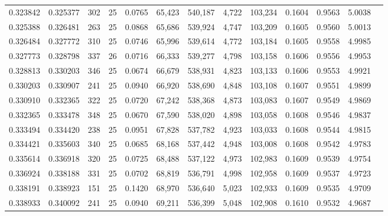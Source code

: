 \begin{tabular}{rrrrrrrrrrrrr}
0.323842 & 0.325377 &   302 &  25 &                                     0.0765 &  65,423 & 540,187 &   4,722 & 103,234 & 0.1604 & 0.9563 & 5.0038 \\
0.325388 & 0.326481 &   263 &  25 &                                     0.0868 &  65,686 & 539,924 &   4,747 & 103,209 & 0.1605 & 0.9560 & 5.0013 \\
0.326484 & 0.327772 &   310 &  25 &                                     0.0746 &  65,996 & 539,614 &   4,772 & 103,184 & 0.1605 & 0.9558 & 4.9985 \\
0.327773 & 0.328798 &   337 &  26 &                                     0.0716 &  66,333 & 539,277 &   4,798 & 103,158 & 0.1606 & 0.9556 & 4.9953 \\
0.328813 & 0.330203 &   346 &  25 &                                     0.0674 &  66,679 & 538,931 &   4,823 & 103,133 & 0.1606 & 0.9553 & 4.9921 \\
0.330203 & 0.330907 &   241 &  25 &                                     0.0940 &  66,920 & 538,690 &   4,848 & 103,108 & 0.1607 & 0.9551 & 4.9899 \\
0.330910 & 0.332365 &   322 &  25 &                                     0.0720 &  67,242 & 538,368 &   4,873 & 103,083 & 0.1607 & 0.9549 & 4.9869 \\
0.332365 & 0.333478 &   348 &  25 &                                     0.0670 &  67,590 & 538,020 &   4,898 & 103,058 & 0.1608 & 0.9546 & 4.9837 \\
0.333494 & 0.334420 &   238 &  25 &                                     0.0951 &  67,828 & 537,782 &   4,923 & 103,033 & 0.1608 & 0.9544 & 4.9815 \\
0.334421 & 0.335603 &   340 &  25 &                                     0.0685 &  68,168 & 537,442 &   4,948 & 103,008 & 0.1608 & 0.9542 & 4.9783 \\
0.335614 & 0.336918 &   320 &  25 &                                     0.0725 &  68,488 & 537,122 &   4,973 & 102,983 & 0.1609 & 0.9539 & 4.9754 \\
0.336924 & 0.338188 &   331 &  25 &                                     0.0702 &  68,819 & 536,791 &   4,998 & 102,958 & 0.1609 & 0.9537 & 4.9723 \\
0.338191 & 0.338923 &   151 &  25 &                                     0.1420 &  68,970 & 536,640 &   5,023 & 102,933 & 0.1609 & 0.9535 & 4.9709 \\
0.338933 & 0.340092 &   241 &  25 &                                     0.0940 &  69,211 & 536,399 &   5,048 & 102,908 & 0.1610 & 0.9532 & 4.9687 \\

\end{tabular}
